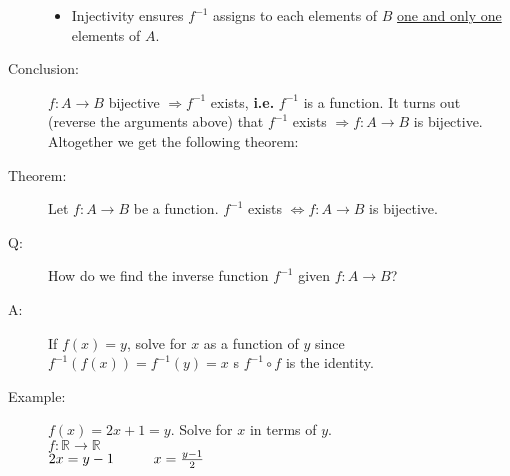\documentclass[10pt]{article}
\begin{document}
\begin{description}
\begin{itemize}
			\item Injectivity ensures $f^{-1}$ assigns to each elements of $B$ \underline{one and only one} elements of $A$.
		\end{itemize}
		\item[Conclusion:] $f:A \rightarrow B$ bijective $\Rightarrow f^{-1}$ exists, \textbf{i.e.} $f^{-1} $ is a function. It turns out (reverse the arguments above) that $f^{-1}$ exists $\Rightarrow f:A \rightarrow B$ is bijective. \\
		Altogether we get the following theorem:
		\item[Theorem:] Let $f:A \rightarrow B$ be a function. $f^{-1}$ exists $\Leftrightarrow f:A \rightarrow B$ is bijective.
		\item[Q:] How do we find the inverse function $f^{-1}$ given $f: A \rightarrow B$?
		\item[A:] If $f(x)=y$, solve for $x$ as a function of $y$ since $f^{-1}(f(x))=f^{-1}(y)=x$ s $f^{-1} \circ f$ is the identity.
		\item[Example:] $f(x)=2x+1=y$. Solve for $x$ in terms of $y$. \\
		$f: \mathbb{R} \rightarrow \mathbb{R}$ \\
		$2x = y-1 \hspace{10mm} x = \frac{y-1}{2}$
	\end{description}
	
\end{document}
